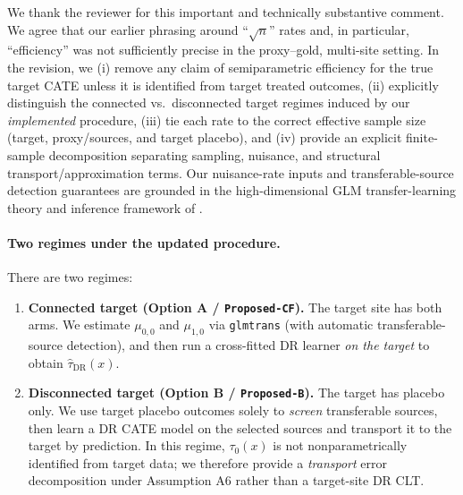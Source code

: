 {\color{blue}
We thank the reviewer for this important and technically substantive comment. We agree that our earlier phrasing around ``$\sqrt{n}$'' rates and, in particular, ``efficiency'' was not sufficiently precise in the proxy--gold, multi-site setting. In the revision, we (i) remove any claim of semiparametric efficiency for the true target CATE unless it is identified from target treated outcomes, (ii) explicitly distinguish the connected vs.\ disconnected target regimes induced by our \emph{implemented} procedure, (iii) tie each rate to the correct effective sample size (target, proxy/sources, and target placebo), and (iv) provide an explicit finite-sample decomposition separating sampling, nuisance, and structural transport/approximation terms. Our nuisance-rate inputs and transferable-source detection guarantees are grounded in the high-dimensional GLM transfer-learning theory and inference framework of \cite{tian2023transfer}.

\paragraph{Two regimes under the updated procedure.}
There are two regimes:
\begin{enumerate}[leftmargin=*]
\item \textbf{Connected target (Option A / \texttt{Proposed-CF}).}
The target site has both arms. We estimate $\mu_{0,0}$ and $\mu_{1,0}$ via \texttt{glmtrans} (with automatic transferable-source detection), and then run a cross-fitted DR learner \emph{on the target} to obtain $\widehat\tau_{\mathrm{DR}}(x)$.
\item \textbf{Disconnected target (Option B / \texttt{Proposed-B}).}
The target has placebo only. We use target placebo outcomes solely to \emph{screen} transferable sources, then learn a DR CATE model on the selected sources and transport it to the target by prediction. In this regime, $\tau_0(x)$ is not nonparametrically identified from target data; we therefore provide a \emph{transport} error decomposition under Assumption A6 rather than a target-site DR CLT.
\end{enumerate}

}
